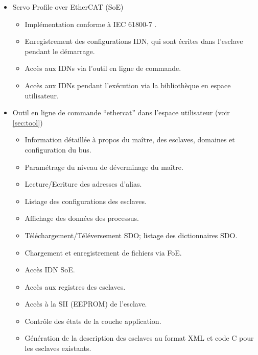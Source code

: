 \documentclass[a4paper,12pt,BCOR6mm,bibtotoc,idxtotoc]{scrbook}
\begin{document}
\begin{itemize}
\begin{itemize}
  \end{itemize}

\item Servo Profile over EtherCAT (SoE)

  \begin{itemize}

  \item Impl\'ementation conforme \`a IEC 61800-7 \cite{soespec}.

  \item Enregistrement des configurations IDN, qui sont \'ecrites dans l'esclave pendant le d\'emarrage.

  \item Acc\`es aux IDNs via l'outil en ligne de commande.

  \item Acc\`es aux IDNs pendant l'ex\'ecution via la biblioth\`eque en espace utilisateur.

  \end{itemize}

\item Outil en ligne de commande ``ethercat'' dans l'espace
  utilisateur (voir \autoref{sec:tool})

  \begin{itemize}

  \item Information d\'etaill\'ee \`a propos du ma\^itre, des
    esclaves, domaines et configuration du bus.
  \item Param\'etrage du niveau de d\'everminage du ma\^itre.
  \item Lecture/Ecriture des adresses d'alias.
  \item Listage des configurations des esclaves.
  \item Affichage des donn\'ees des processus.
  \item T\'el\'echargement/T\'el\'eversement SDO; listage des
    dictionnaires SDO.
  \item Chargement et enregistrement de fichiers via FoE.
  \item Acc\`es IDN SoE.
  \item Acc\`es aux registres des esclaves.
  \item Acc\`es \`a la SII (EEPROM) de l'esclave.
  \item Contr\^ole des \'etats de la couche application.
  \item G\'en\'eration de la description des esclaves au format XML et
    code C pour les esclaves existants.


\end{itemize}
\end{itemize}
\end{document}
